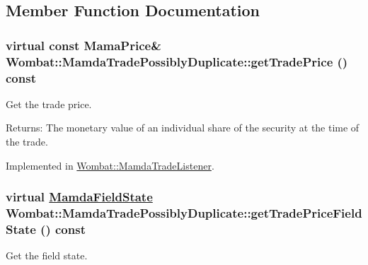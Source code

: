 \subsection{Member Function Documentation}
\hypertarget{classWombat_1_1MamdaTradePossiblyDuplicate_af6c3350ba0d73411c51a8cc475e73ab}{
\subsubsection[getTradePrice]{\setlength{\rightskip}{0pt plus 5cm}virtual const Mama\-Price\& Wombat::Mamda\-Trade\-Possibly\-Duplicate::get\-Trade\-Price () const}}
\label{classWombat_1_1MamdaTradePossiblyDuplicate_af6c3350ba0d73411c51a8cc475e73ab}


Get the trade price. 

\begin{Desc}
\item[Returns:]The monetary value of an individual share of the security at the time of the trade. \end{Desc}


Implemented in \hyperlink{classWombat_1_1MamdaTradeListener_f2f5cd501bc1fcb6717a81c001004228}{Wombat::Mamda\-Trade\-Listener}.\hypertarget{classWombat_1_1MamdaTradePossiblyDuplicate_223865efb46d5616004c9d14da3c457b}{
\subsubsection[getTradePriceFieldState]{\setlength{\rightskip}{0pt plus 5cm}virtual \hyperlink{namespaceWombat_93aac974f2ab713554fd12a1fa3b7d2a}{Mamda\-Field\-State} Wombat::Mamda\-Trade\-Possibly\-Duplicate::get\-Trade\-Price\-Field\-State () const}}
\label{classWombat_1_1MamdaTradePossiblyDuplicate_223865efb46d5616004c9d14da3c457b}


Get the field state. 

